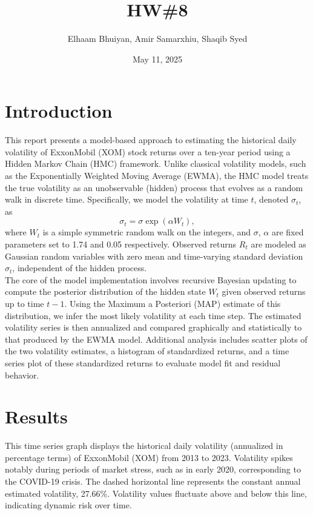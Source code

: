 \documentclass{report}
\title{HW\#8}
\author{
Elhaam Bhuiyan,
Amir Samarxhiu,
Shaqib Syed
}
\date{May 11, 2025}
\begin{document}
\maketitle

\section*{Introduction}
This report presents a model-based approach to estimating the historical daily volatility of ExxonMobil (XOM) stock returns over a ten-year period using a Hidden Markov Chain (HMC) framework. Unlike classical volatility models, such as the Exponentially Weighted Moving Average (EWMA), the HMC model treats the true volatility as an unobservable (hidden) process that evolves as a random walk in discrete time. Specifically, we model the volatility at time $t$, denoted $\sigma_t$, as
\[
\sigma_t = \sigma \exp(\alpha W_t),
\]
where $W_t$ is a simple symmetric random walk on the integers, and $\sigma$, $\alpha$ are fixed parameters set to 1.74 and 0.05 respectively. Observed returns $R_t$ are modeled as Gaussian random variables with zero mean and time-varying standard deviation $\sigma_t$, independent of the hidden process. \\

The core of the model implementation involves recursive Bayesian updating to compute the posterior distribution of the hidden state $W_t$ given observed returns up to time $t-1$. Using the Maximum a Posteriori (MAP) estimate of this distribution, we infer the most likely volatility at each time step. The estimated volatility series is then annualized and compared graphically and statistically to that produced by the EWMA model. Additional analysis includes scatter plots of the two volatility estimates, a histogram of standardized returns, and a time series plot of these standardized returns to evaluate model fit and residual behavior. \\

\newpage

\section*{Results}

This time series graph displays the historical daily volatility (annualized in percentage terms) of ExxonMobil (XOM) from 2013 to 2023. Volatility spikes notably during periods of market stress, such as in early 2020, corresponding to the COVID-19 crisis. The dashed horizontal line represents the constant annual estimated volatility, 27.66\%. Volatility values fluctuate above and below this line, indicating dynamic risk over time. \\
\end{document}
